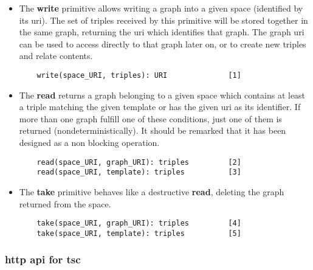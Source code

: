 \begin{itemize}
 \item The \textbf{write} primitive allows writing a graph into a given space (identified by its \acs{uri}).
	The set of triples received by this primitive will be stored together in the same graph, returning the \acs{uri} which identifies that graph.
	The graph \acs{uri} can be used to access directly to that graph later on, or to create new triples and relate contents.
  \begin{lstlisting}
    write(space_URI, triples): URI              [1]
  \end{lstlisting}


  \item The \textbf{read} returns a graph belonging to a given space which contains at least a triple matching the given template or has the given \acs{uri} as its identifier.
	If more than one graph fulfill one of these conditions, just one of them is returned (nondeterministically).
	It should be remarked that it has been designed as a non blocking operation.
  \begin{lstlisting}
    read(space_URI, graph_URI): triples         [2]
    read(space_URI, template): triples          [3]
  \end{lstlisting}
  
  
  \item The \textbf{take} primitive behaves like a destructive \textbf{read}, deleting the graph returned from the space.
  \begin{lstlisting}
    take(space_URI, graph_URI): triples         [4]
    take(space_URI, template): triples          [5]
  \end{lstlisting}

\end{itemize}



\subsubsection{\acs{http} \acs{api} for \acs{tsc}}
\label{sec:httpapi}

